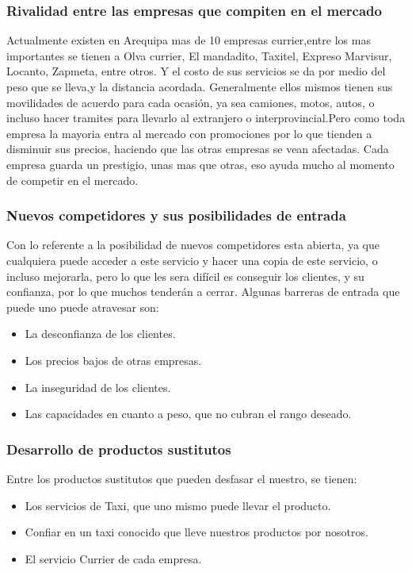 \subsubsection{Rivalidad entre las empresas que compiten en el mercado}
Actualmente existen en Arequipa mas de 10 empresas currier,entre los mas importantes se tienen a Olva currier, El mandadito, Taxitel, Expreso Marvisur, Locanto, Zapmeta, entre otros. Y el costo de sus servicios se da por medio del peso que se lleva,y la distancia acordada. Generalmente ellos mismos tienen sus movilidades de acuerdo para cada ocasión, ya sea camiones, motos, autos, o incluso hacer tramites para llevarlo al extranjero o interprovincial.Pero como toda empresa la mayoria entra al mercado con promociones por lo que tienden a disminuir sus precios, haciendo que las otras empresas se vean afectadas. 
Cada empresa guarda un prestigio, unas mas que otras, eso ayuda mucho al momento de competir en el mercado.

\subsubsection{Nuevos competidores y sus posibilidades de entrada}
Con lo referente a la posibilidad de nuevos competidores esta abierta, ya que cualquiera puede acceder a este servicio y hacer una copia de este servicio, o incluso mejorarla, pero lo que les sera difícil es conseguir los clientes, y su confianza, por lo que muchos tenderán a cerrar.
Algunas barreras de entrada que puede uno puede atravesar son:
\begin{itemize}
    \item La desconfianza de los clientes.
    \item Los precios bajos de otras empresas.
    \item La inseguridad de los clientes.
    \item Las capacidades en cuanto a peso, que no cubran el rango deseado. 
\end{itemize}

\subsubsection{Desarrollo de productos sustitutos}
Entre los productos sustitutos que pueden desfasar el nuestro, se tienen:
\begin{itemize}
    \item Los servicios de Taxi, que uno mismo puede llevar el producto.
    \item Confiar en un taxi conocido que lleve nuestros productos por nosotros.
    \item El servicio Currier de cada empresa.
\end{itemize}

